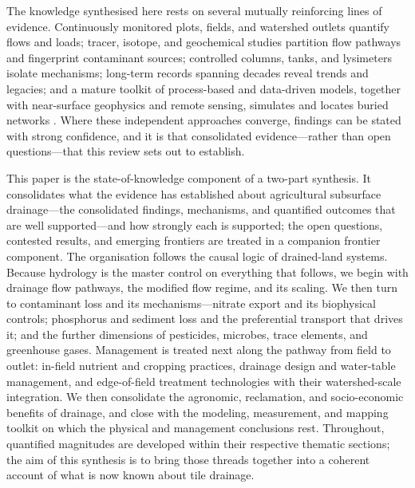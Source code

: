 The knowledge synthesised here rests on several mutually reinforcing lines of
evidence. Continuously monitored plots, fields, and watershed outlets quantify
flows and loads; tracer, isotope, and geochemical studies partition flow
pathways and fingerprint contaminant sources; controlled columns, tanks, and
lysimeters isolate mechanisms; long-term records spanning decades reveal trends
and legacies; and a mature toolkit of process-based and data-driven models,
together with near-surface geophysics and remote sensing, simulates and locates
buried networks
\parencite{Smith2011,Singh2019b,Gowda2012,Allred2020}. Where these independent
approaches converge, findings can be stated with strong confidence, and it is
that consolidated evidence---rather than open questions---that this review sets
out to establish.

This paper is the state-of-knowledge component of a two-part synthesis. It
consolidates what the evidence has established about agricultural subsurface
drainage---the consolidated findings, mechanisms, and quantified outcomes that
are well supported---and how strongly each is supported; the open questions,
contested results, and emerging frontiers are treated in a companion frontier
component. The organisation follows the causal logic of drained-land systems.
Because hydrology is the master control on everything that follows, we begin
with drainage flow pathways, the modified flow regime, and its scaling. We then
turn to contaminant loss and its mechanisms---nitrate export and its biophysical
controls; phosphorus and sediment loss and the preferential transport that
drives it; and the further dimensions of pesticides, microbes, trace elements,
and greenhouse gases. Management is treated next along the pathway from field to
outlet: in-field nutrient and cropping practices, drainage design and
water-table management, and edge-of-field treatment technologies with their
watershed-scale integration. We then consolidate the agronomic, reclamation, and
socio-economic benefits of drainage, and close with the modeling, measurement,
and mapping toolkit on which the physical and management conclusions rest.
Throughout, quantified magnitudes are developed within their respective thematic
sections; the aim of this synthesis is to bring those threads together into a
coherent account of what is now known about tile drainage.